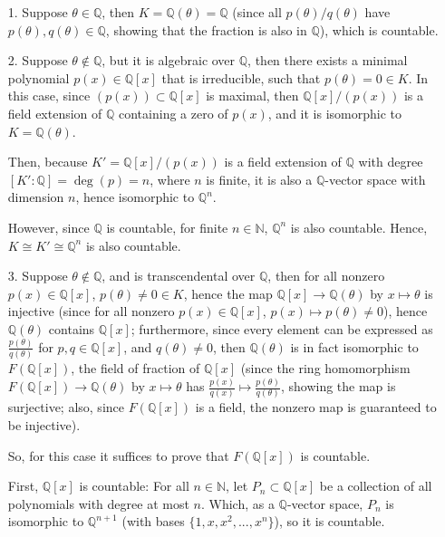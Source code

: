 \documentclass{article}
\begin{document}
\begin{itemize}
    \item[1.] Suppose $\theta\in\mathbb{Q}$, then $K=\mathbb{Q}(\theta)=\mathbb{Q}$ (since all $p(\theta)/q(\theta)$ have $p(\theta),q(\theta)\in\mathbb{Q}$, showing that the fraction is also in $\mathbb{Q}$), which is countable.

    \item[2.] Suppose $\theta\notin\mathbb{Q}$, but it is algebraic over $\mathbb{Q}$, then there exists a minimal polynomial $p(x)\in\mathbb{Q}[x]$ that is irreducible,
    such that $p(\theta)=0\in K$. In this case, since $(p(x))\subset \mathbb{Q}[x]$ is maximal, then $\mathbb{Q}[x]/(p(x))$ is a field extension of $\mathbb{Q}$ containing a zero of $p(x)$,
    and it is isomorphic to $K=\mathbb{Q}(\theta)$.

    Then, because $K'=\mathbb{Q}[x]/(p(x))$ is a field extension of $\mathbb{Q}$ with degree $[K':\mathbb{Q}]=\deg(p)=n$, where $n$ is finite,
    it is also a $\mathbb{Q}$-vector space with dimension $n$, hence isomorphic to $\mathbb{Q}^n$.

    However, since $\mathbb{Q}$ is countable, for finite $n\in\mathbb{N}$, $\mathbb{Q}^n$ is also countable. Hence, $K\cong K'\cong \mathbb{Q}^n$ is also countable.

    \item[3.] Suppose $\theta\notin \mathbb{Q}$, and is transcendental over $\mathbb{Q}$, then for all nonzero $p(x)\in\mathbb{Q}[x]$, $p(\theta)\neq 0\in K$,
    hence the map $\mathbb{Q}[x]\rightarrow \mathbb{Q}(\theta)$ by $x\mapsto\theta$ is injective (since for all nonzero $p(x)\in\mathbb{Q}[x]$, $p(x)\mapsto p(\theta)\neq 0$),
    hence $\mathbb{Q}(\theta)$ contains $\mathbb{Q}[x]$; furthermore, since every element can be expressed as $\frac{p(\theta)}{q(\theta)}$ for $p,q\in\mathbb{Q}[x]$, and $q(\theta)\neq 0$,
    then $\mathbb{Q}(\theta)$ is in fact isomorphic to $F(\mathbb{Q}[x])$, the field of fraction of $\mathbb{Q}[x]$ (since the ring homomorphism $F(\mathbb{Q}[x])\rightarrow \mathbb{Q}(\theta)$ by $x\mapsto \theta$ has $\frac{p(x)}{q(x)}\mapsto \frac{p(\theta)}{q(\theta)}$, 
    showing the map is surjective; also, since $F(\mathbb{Q}[x])$ is a field, the nonzero map is guaranteed to be injective).

    So, for this case it suffices to prove that $F(\mathbb{Q}[x])$ is countable.

    \hfil

    First, $\mathbb{Q}[x]$ is countable: For all $n\in\mathbb{N}$, let $P_n\subset \mathbb{Q}[x]$ be a collection of all polynomials with degree at most $n$. 
    Which, as a $\mathbb{Q}$-vector space, $P_n$ is isomorphic to $\mathbb{Q}^{n+1}$ (with bases $\{1,x,x^2,...,x^{n}\}$), so it is countable.


\end{itemize}
\end{document}
